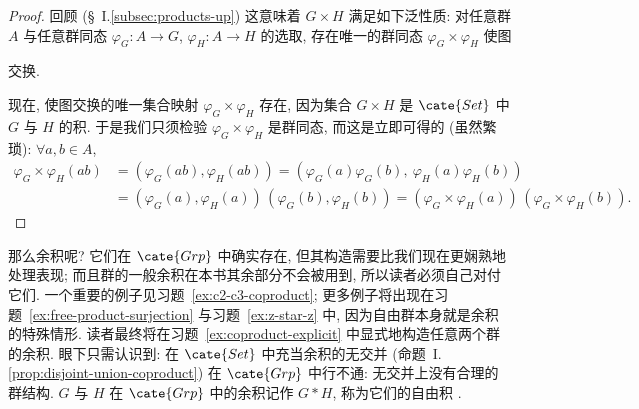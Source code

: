 \begin{proof}
回顾 (\S~I.\ref{subsec:products-up}) 这意味着 $G \times H$ 满足如下泛性质: 对任意群 $A$ 与任意群同态 $\varphi_G : A \to G$, $\varphi_H : A \to H$ 的选取, 存在唯一的群同态 $\varphi_G \times \varphi_H$ 使图
\begin{center}
\end{center}
交换.

现在, 使图交换的唯一集合映射 $\varphi_G \times \varphi_H$ 存在, 因为集合 $G \times H$ 是 $\cate{Set}$ 中 $G$ 与 $H$ 的积. 于是我们只须检验 $\varphi_G \times \varphi_H$ 是群同态, 而这是立即可得的 (虽然繁琐): $\forall a, b \in A$,
\begin{align*}
\varphi_G \times \varphi_H (ab) &= (\varphi_G(ab), \varphi_H(ab)) = (\varphi_G(a)\varphi_G(b),\ \varphi_H(a)\varphi_H(b)) \\
&= (\varphi_G(a), \varphi_H(a))\,(\varphi_G(b), \varphi_H(b)) = (\varphi_G \times \varphi_H(a))\,(\varphi_G \times \varphi_H(b)).
\end{align*}
\end{proof}

那么余积呢? 它们在 $\cate{Grp}$ 中确实存在, 但其构造需要比我们现在更娴熟地处理表现; 而且群的一般余积在本书其余部分不会被用到, 所以读者必须自己对付它们. 一个重要的例子见习题~\ref{ex:c2-c3-coproduct}; 更多例子将出现在习题~\ref{ex:free-product-surjection} 与习题~\ref{ex:z-star-z} 中, 因为自由群本身就是余积的特殊情形. 读者最终将在习题~\ref{ex:coproduct-explicit} 中显式地构造任意两个群的余积. 眼下只需认识到: 在 $\cate{Set}$ 中充当余积的无交并 (命题~I.\ref{prop:disjoint-union-coproduct}) 在 $\cate{Grp}$ 中行不通: 无交并上没有合理的群结构. $G$ 与 $H$ 在 $\cate{Grp}$ 中的余积记作 $G * H$, 称为它们的自由积%
.


